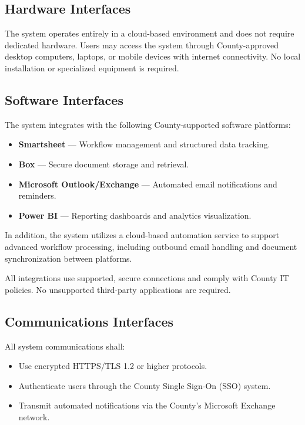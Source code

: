 \documentclass[12pt]{article}
\begin{document}

\subsection{Hardware Interfaces}

The system operates entirely in a cloud-based environment and does not require dedicated hardware. Users may access the system through County-approved desktop computers, laptops, or mobile devices with internet connectivity. No local installation or specialized equipment is required.


\subsection{Software Interfaces}

The system integrates with the following County-supported software platforms:

\begin{itemize}
    \item \textbf{Smartsheet} — Workflow management and structured data tracking.
    \item \textbf{Box} — Secure document storage and retrieval.
    \item \textbf{Microsoft Outlook/Exchange} — Automated email notifications and reminders.
    \item \textbf{Power BI} — Reporting dashboards and analytics visualization.
\end{itemize}

In addition, the system utilizes a cloud-based automation service to support advanced workflow processing, including outbound email handling and document synchronization between platforms.

All integrations use supported, secure connections and comply with County IT policies. No unsupported third-party applications are required.


\subsection{Communications Interfaces}

All system communications shall:

\begin{itemize}
    \item Use encrypted HTTPS/TLS 1.2 or higher protocols.
    \item Authenticate users through the County Single Sign-On (SSO) system.
    \item Transmit automated notifications via the County’s Microsoft Exchange network.
\end{itemize}
\end{document}
